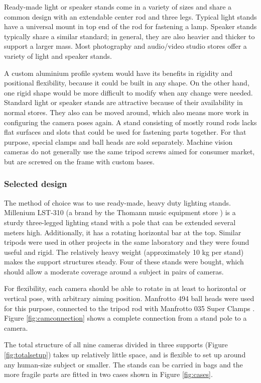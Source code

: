 Ready-made light or speaker stands come in a variety of sizes and share a common design with an extendable center rod and three legs.
Typical light stands have a universal mount in top end of the rod for fastening a lamp.
Speaker stands typically share a similar standard; in general, they are also heavier and thicker to support a larger mass.
Most photography and audio/video studio stores offer a variety of light and speaker stands.

A custom aluminium profile system would have its benefits in rigidity and positional flexibility, because it could be built in any shape.
On the other hand, one rigid shape would be more difficult to modify when any change were needed.
Standard light or speaker stands are attractive because of their availability in normal stores.
They also can be moved around, which also means more work in configuring the camera poses again.
A stand consisting of mostly round rods lacks flat surfaces and slots that could be used for fastening parts together.
For that purpose, special clamps and ball heads are sold separately.
Machine vision cameras do not generally use the same tripod screws aimed for consumer market, but are screwed on the frame with custom bases.

\subsubsection{Selected design}

The method of choice was to use ready-made, heavy duty lighting stands.
Millenium LST-310 (a brand by the Thomann music equipment store \cite{thomann}) is a sturdy three-legged lighting stand with a pole that can be extended several meters high.
Additionally, it has a rotating horizontal bar at the top.
Similar tripods were used in other projects in the same laboratory and they were found useful and rigid.
The relatively heavy weight (approximately 10 kg per stand) makes the support structures steady.
Four of these stands were bought, which should allow a moderate coverage around a subject in pairs of cameras.

For flexibility, each camera should be able to rotate in at least to horizontal or vertical pose, with arbitrary aiming position.
Manfrotto 494 ball heads \cite{manfrotto494} were used for this purpose, connected to the tripod rod with Manfrotto 035 Super Clamps \cite{manfrotto035}.
Figure \ref{fig:camconnection} shows a complete connection from a stand pole to a camera.

The total structure of all nine cameras divided in three supports (Figure \ref{fig:totalsetup}) takes up relatively little space, and is flexible to set up around any human-size subject or smaller.
The stands can be carried in bags and the more fragile parts are fitted in two cases shown in Figure \ref{fig:cases}.

